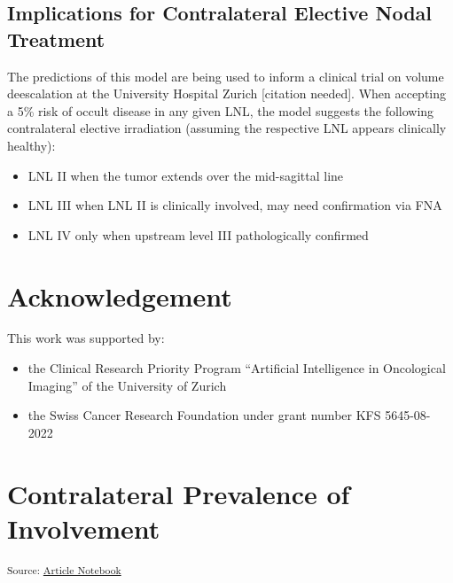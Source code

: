 \documentclass[
  sn-mathphys-num,
]{sn-jnl}
\providecommand{\tightlist}{%
  \setlength{\itemsep}{0pt}\setlength{\parskip}{0pt}}\usepackage{longtable,booktabs,array}
\begin{document}
\subsection{Implications for Contralateral Elective Nodal
Treatment}\label{implications-for-contralateral-elective-nodal-treatment}

The predictions of this model are being used to inform a clinical trial
on volume deescalation at the University Hospital Zurich {[}citation
needed{]}. When accepting a 5\% risk of occult disease in any given LNL,
the model suggests the following contralateral elective irradiation
(assuming the respective LNL appears clinically healthy):

\begin{itemize}
\tightlist
\item
  LNL II when the tumor extends over the mid-sagittal line
\item
  LNL III when LNL II is clinically involved, may need confirmation via
  FNA
\item
  LNL IV only when upstream level III pathologically confirmed
\end{itemize}

\section{Acknowledgement}\label{acknowledgement}

This work was supported by:

\begin{itemize}
\tightlist
\item
  the Clinical Research Priority Program ``Artificial Intelligence in
  Oncological Imaging'' of the University of Zurich
\item
  the Swiss Cancer Research Foundation under grant number KFS
  5645-08-2022
\end{itemize}

\section{Contralateral Prevalence of
Involvement}\label{contralateral-prevalence-of-involvement}

\textsubscript{Source:
\href{https://rmnldwg.github.io/bilateral-paper/manuscript-preview.html}{Article
Notebook}}
\end{document}
